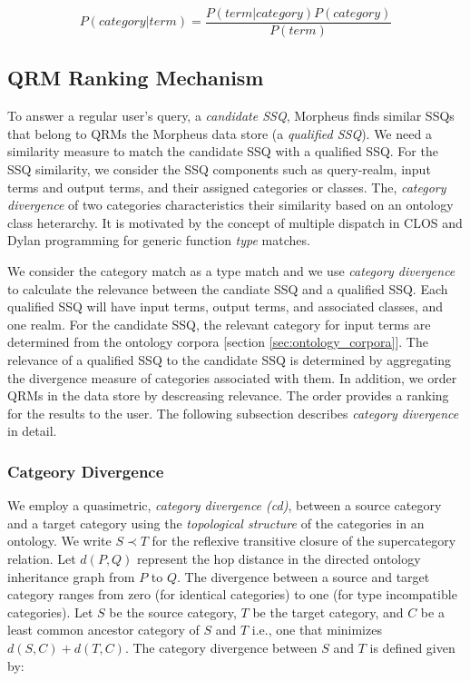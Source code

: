 \begin{equation}
\label{eq:bayesrule}
P (category | term) = \frac{P(term | category) P(category)}{P(term)}
\end{equation}    



\subsection{QRM Ranking Mechanism} 
\label{sec:qrm_ranking}

To answer a regular user's query, a \textit{candidate
SSQ}, Morpheus finds similar SSQs that belong to QRMs the Morpheus data store (a
\textit{qualified SSQ}). We need a similarity measure to match the candidate SSQ
with a qualified SSQ. For the SSQ similarity, we
consider the SSQ components such as query-realm, input
terms and output terms, and their assigned categories or classes. The,
\textit{category divergence} of two categories characteristics their 
similarity based on an ontology class heterarchy. 
It is motivated by the concept of multiple
dispatch in CLOS and Dylan programming for generic function \emph{type} matches. 

We consider the category match as a type match and we use 
\emph{category divergence} to calculate the relevance between 
the candiate SSQ and a qualified SSQ. Each qualified SSQ will 
have input terms, output terms, and associated classes, and one realm. 
For the candidate SSQ, the relevant category for input terms 
are determined from the ontology corpora [section \ref{sec:ontology_corpora}]. The relevance of a qualified SSQ to the candidate SSQ is 
determined by aggregating the divergence measure of categories 
associated with them. In addition, we order QRMs in the data store 
by descreasing relevance. The order provides a ranking for the results 
to the user. The following subsection describes \emph{category divergence} 
in detail.

\subsubsection{Catgeory Divergence}
\label{sec:ctd}

We employ a quasimetric, \textit{category
divergence (cd)},
between a source category and a target category using the \textit{topological
structure} of the categories in an ontology. We write $S \prec T$ for the
reflexive
transitive closure of the supercategory relation. Let $d(P,Q)$ represent the hop
distance in the directed ontology inheritance graph from $P$ to $Q$. The
divergence between a source and target category ranges from zero (for identical
categories) to one (for type incompatible categories). Let $S$ be the source
category, $T$ be
the target category, and $C$ be a least common ancestor category of $S$ and
$T$ i.e., one that minimizes $d(S,C) + d(T,C)$. The category divergence between $S$ and $T$ is defined given by:

